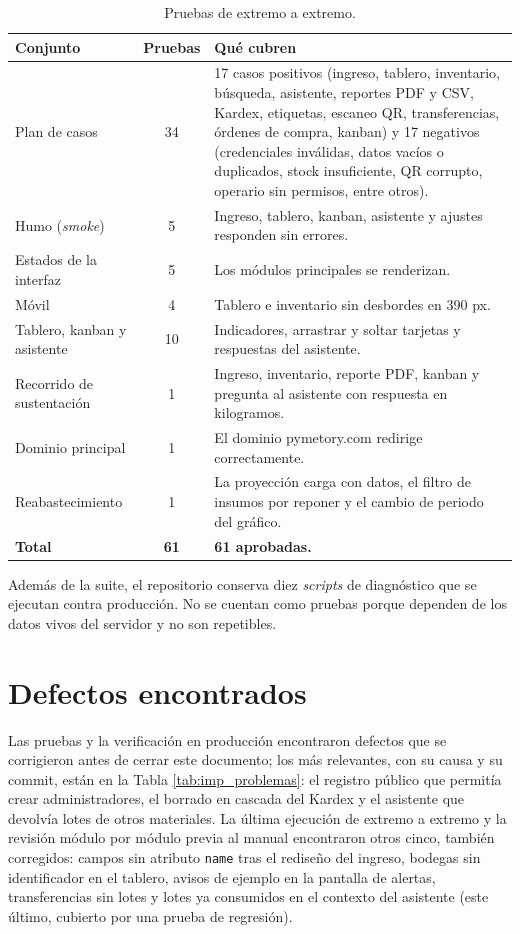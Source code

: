 \begin{table}[!htbp]
\centering
\caption{Pruebas de extremo a extremo.}
\label{tab:pru_e2e}
\begin{tabular}{|p{4.3cm}|c|p{8.8cm}|}
\hline
\textbf{Conjunto} & \textbf{Pruebas} & \textbf{Qué cubren} \\
\hline
Plan de casos & 34 & 17 casos positivos (ingreso, tablero, inventario, búsqueda, asistente, reportes PDF y CSV, Kardex, etiquetas, escaneo QR, transferencias, órdenes de compra, kanban) y 17 negativos (credenciales inválidas, datos vacíos o duplicados, stock insuficiente, QR corrupto, operario sin permisos, entre otros). \\ \hline
Humo (\textit{smoke}) & 5 & Ingreso, tablero, kanban, asistente y ajustes responden sin errores. \\ \hline
Estados de la interfaz & 5 & Los módulos principales se renderizan. \\ \hline
Móvil & 4 & Tablero e inventario sin desbordes en 390 px. \\ \hline
Tablero, kanban y asistente & 10 & Indicadores, arrastrar y soltar tarjetas y respuestas del asistente. \\ \hline
Recorrido de sustentación & 1 & Ingreso, inventario, reporte PDF, kanban y pregunta al asistente con respuesta en kilogramos. \\ \hline
Dominio principal & 1 & El dominio pymetory.com redirige correctamente. \\ \hline
Reabastecimiento & 1 & La proyección carga con datos, el filtro de insumos por reponer y el cambio de periodo del gráfico. \\ \hline
\textbf{Total} & \textbf{61} & \textbf{61 aprobadas.} \\ \hline
\end{tabular}
\end{table}

Además de la suite, el repositorio conserva diez \textit{scripts} de diagnóstico que se ejecutan contra producción. No se cuentan como pruebas porque dependen de los datos vivos del servidor y no son repetibles.

\section{Defectos encontrados}
\label{sec:pru_defectos}

Las pruebas y la verificación en producción encontraron defectos que se corrigieron antes de cerrar este documento; los más relevantes, con su causa y su commit, están en la Tabla \ref{tab:imp_problemas}: el registro público que permitía crear administradores, el borrado en cascada del Kardex y el asistente que devolvía lotes de otros materiales. La última ejecución de extremo a extremo y la revisión módulo por módulo previa al manual encontraron otros cinco, también corregidos: campos sin atributo \texttt{name} tras el rediseño del ingreso, bodegas sin identificador en el tablero, avisos de ejemplo en la pantalla de alertas, transferencias sin lotes y lotes ya consumidos en el contexto del asistente (este último, cubierto por una prueba de regresión).

